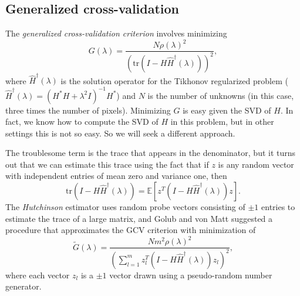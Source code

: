 \documentclass[12pt, leqno]{article} %
\begin{document}
\subsection{Generalized cross-validation}

The {\em generalized cross-validation criterion} involves minimizing
\[
  G(\lambda) =
  \frac{N \rho(\lambda)^2}
       {\left( \mathrm{tr}(I-H \hat{H}^{\dagger}(\lambda)) \right)^2},
\]
where $\hat{H}^\dagger(\lambda)$ is the solution operator for
the Tikhonov regularized problem ($\hat{H}^\dagger(\lambda) = (H^*H + \lambda^2I)^{-1}H^*$) and $N$ is the number of unknowns
(in this case, three times the number of pixels).  Minimizing $G$ is
easy given the SVD of $H$.  In fact, we know how to compute the SVD
of $H$ in this problem, but in other settings this is not so easy.
So we will seek a different approach.

The troublesome
term is the trace that appears in the denominator, but it turns out
that we can estimate this trace using the fact that if $z$ is any
random vector with independent entries of mean zero and variance one,
then
\[
  \mathrm{tr}(I-H \hat{H}^\dagger(\lambda)) =
  \mathbb{E}\left[ z^T (I-H \hat{H}^\dagger(\lambda)) z \right].
\]
The {\em Hutchinson} estimator uses random probe vectors consisting
of $\pm 1$ entries to estimate the trace of a large matrix, and Golub
and von Matt suggested a procedure that approximates the GCV criterion
with minimization of
\[
  \tilde{G}(\lambda) =
  \frac{Nm^2 \rho(\lambda)^2}
  {\left( \sum_{l=1}^m z_l^T(I-H \hat{H}^{\dagger}(\lambda)) z_l \right)^2},
\]
where each vector $z_l$ is a $\pm 1$ vector drawn using a pseudo-random
number generator.
\end{document}
